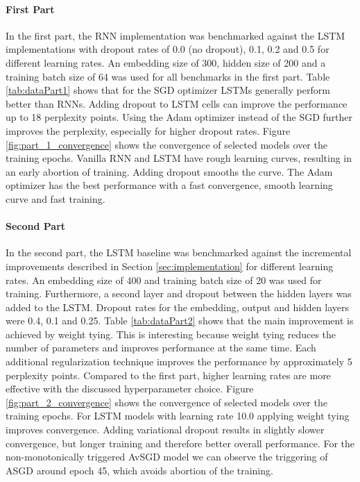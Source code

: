 \documentclass[a4paper]{article}
\begin{document}
\paragraph*{First Part} 
In the first part, the RNN implementation was benchmarked against the LSTM implementations with dropout rates of 0.0 (no dropout), 0.1, 0.2 and 0.5 for different learning rates. An embedding size of 300, hidden size of 200 and a training batch size of 64 was used for all benchmarks in the first part. Table \ref{tab:dataPart1} shows that for the SGD optimizer LSTMs generally perform better than RNNs. Adding dropout to LSTM cells can improve the performance up to 18 perplexity points. Using the Adam optimizer instead of the SGD further improves the perplexity, especially for higher dropout rates. Figure \ref{fig:part_1_convergence} shows the convergence of selected models over the training epochs. Vanilla RNN and LSTM have rough learning curves, resulting in an early abortion of training. Adding dropout smooths the curve. The Adam optimizer has the best performance with a fast convergence, smooth learning curve and fast training.

\paragraph*{Second Part}
In the second part, the LSTM baseline was benchmarked against the incremental improvements described in Section \ref{sec:implementation} for different learning rates. An embedding size of 400 and training batch size of 20 was used for training. Furthermore, a second layer and dropout between the hidden layers was added to the LSTM. Dropout rates for the embedding, output and hidden layers were 0.4, 0.1 and 0.25. Table \ref{tab:dataPart2} shows that the main improvement is achieved by weight tying. This is interesting because weight tying reduces the number of parameters and improves performance at the same time. Each additional regularization technique improves the performance by approximately 5 perplexity points. Compared to the first part, higher learning rates are more effective with the discussed hyperparameter choice.
Figure \ref{fig:part_2_convergence} shows the convergence of selected models over the training epochs. For LSTM models with learning rate 10.0 applying weight tying improves convergence. Adding variational dropout results in slightly slower convergence, but longer training and therefore better overall performance. For the non-monotonically triggered AvSGD model we can observe the triggering of ASGD around epoch 45, which avoids abortion of the training. 
\end{document}
